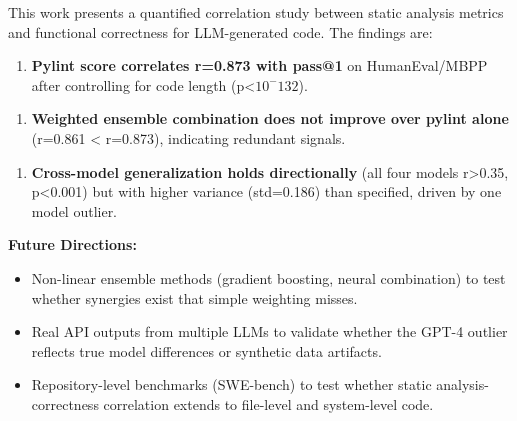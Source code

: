 
This work presents a quantified correlation study between static analysis metrics and functional correctness for LLM-generated code. The findings are:

\begin{enumerate}
\item \textbf{Pylint score correlates r=0.873 with pass@1} on HumanEval/MBPP after controlling for code length (p<$10^-132$).
\end{enumerate}

\begin{enumerate}
\item \textbf{Weighted ensemble combination does not improve over pylint alone} (r=0.861 < r=0.873), indicating redundant signals.
\end{enumerate}

\begin{enumerate}
\item \textbf{Cross-model generalization holds directionally} (all four models r>0.35, p<0.001) but with higher variance (std=0.186) than specified, driven by one model outlier.
\end{enumerate}

\textbf{Future Directions:}

\begin{itemize}
\item Non-linear ensemble methods (gradient boosting, neural combination) to test whether synergies exist that simple weighting misses.
\item Real API outputs from multiple LLMs to validate whether the GPT-4 outlier reflects true model differences or synthetic data artifacts.
\item Repository-level benchmarks (SWE-bench) to test whether static analysis-correctness correlation extends to file-level and system-level code.
\end{itemize}
